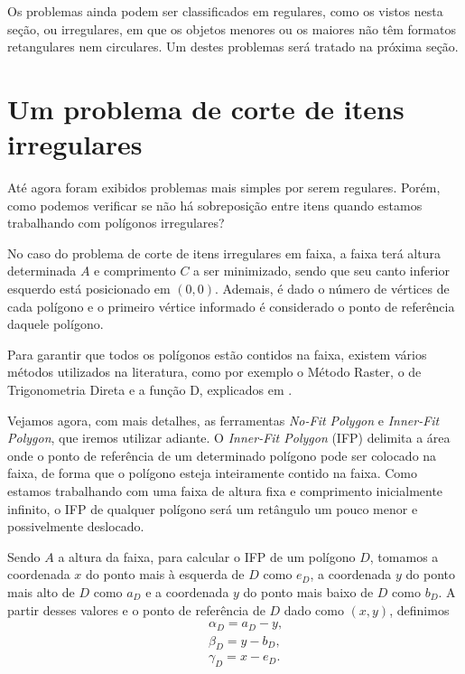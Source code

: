 \documentclass{article}
\begin{document}
Os problemas ainda podem ser classificados em regulares, como os vistos nesta seção, ou irregulares, em que os objetos menores ou os maiores não têm formatos retangulares nem circulares. Um destes problemas será tratado na próxima seção.



\section{Um problema de corte de itens irregulares} \label{sec:irregular}

Até agora foram exibidos problemas mais simples por serem regulares. Porém, como podemos verificar se não há sobreposição entre itens quando estamos trabalhando com polígonos irregulares?

No caso do problema de corte de itens irregulares em faixa, a faixa terá altura determinada $A$ e comprimento $C$ a ser minimizado, sendo que seu canto inferior esquerdo está posicionado em $(0,0)$. Ademais, é dado o número de vértices de cada polígono e o primeiro vértice informado é considerado o ponto de referência daquele polígono.

Para garantir que todos os polígonos estão contidos na faixa, existem vários métodos utilizados na literatura, como por exemplo o Método Raster, o de Trigonometria Direta e a função D, explicados em \cite{geometry}. 

Vejamos agora, com mais detalhes, as ferramentas \textit{No-Fit Polygon} e \textit{Inner-Fit Polygon}, que iremos utilizar adiante. O \textit{Inner-Fit Polygon} (IFP) delimita a área onde o ponto de referência de um determinado polígono pode ser colocado na faixa, de forma que o polígono esteja inteiramente contido na faixa. Como estamos trabalhando com uma faixa de altura fixa e comprimento inicialmente infinito, o IFP de qualquer polígono será um retângulo um pouco menor e possivelmente deslocado.

Sendo $A$ a altura da faixa, para calcular o IFP de um polígono $D$, tomamos a coordenada $x$ do ponto mais à esquerda de $D$ como $e_D$, a coordenada $y$ do ponto mais alto de $D$ como $a_D$ e a coordenada $y$ do ponto mais baixo de $D$ como $b_D$. A partir desses valores e o ponto de referência de $D$ dado como $(x, y)$, definimos 
\begin{equation*}
    \begin{aligned}
        \quad & \alpha_D = a_D - y,\\
        & \beta_D = y - b_D,\\
        & \gamma_D = x - e_D.
    \end{aligned}
\end{equation*}
\end{document}
